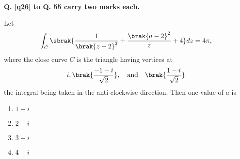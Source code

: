 \textbf{ Q. \ref{q26} to Q. 55 carry two marks each.}

\item \label{q26} Let \begin{align*}
	\int_C \sbrak{ \frac{1}{\brak{z - 2}^2} + \frac{\brak{a - 2}^2}{z} + 4} dz = 4\pi ,
\end{align*} where the close curve $C$ is the triangle having vertices at \begin{align*}
	i, \brak{ \frac{-1-i}{\sqrt{2}}}, \quad \text{and} \quad \brak{\frac{1-i}{\sqrt{2}}}
\end{align*} the integral being taken in the anti-clockwise direction. Then one value of $a$ is \begin{enumerate}
    \item $1 + i$ \item $2 + i$ \item $3 + i$ \item $4 + i$
\end{enumerate}

 



